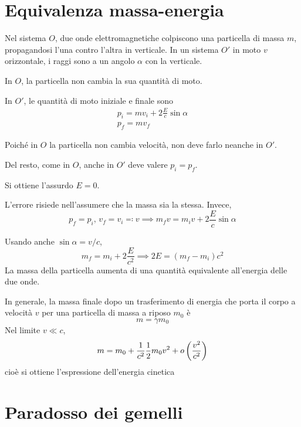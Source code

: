 \section{Equivalenza massa-energia}

Nel sistema $O$, due onde elettromagnetiche colpiscono una particella di massa $m$, propagandosi l'una contro l'altra in verticale.
In un sistema $O'$ in moto $v$ orizzontale, i raggi sono a un angolo $\alpha$ con la verticale.

In $O$, la particella non cambia la sua quantità di moto.

In $O'$, le quantità di moto iniziale e finale sono
\begin{gather}
    p_i = m v_i + 2 \frac{E}{c} \sin\alpha \\
    p_f = m v_f
\end{gather}

Poiché in $O$ la particella non cambia velocità, non deve farlo neanche in $O'$.

Del resto, come in $O$, anche in $O'$ deve valere $p_i = p_f$.

Si ottiene l'assurdo $E = 0$.

L'errore risiede nell'assumere che la massa sia la stessa.
Invece,
\begin{equation}
    p_f = p_i, \, v_f = v_i \eqcolon v
    \implies m_f v = m_i v + 2 \frac{E}{c} \sin\alpha
\end{equation}

Usando anche $\sin \alpha = v/c$,
\begin{equation}
    m_f = m_i + 2 \frac{E}{c^2}
    \implies
    2E = (m_f - m_i) c^2
\end{equation}
La massa della particella aumenta di una quantità equivalente all'energia delle due onde.

In generale, la massa finale dopo un trasferimento di energia che porta il corpo a velocità $v$ per una particella di massa a riposo $m_0$ è
\begin{equation}
    m = \gamma m_0
\end{equation}
Nel limite $v \ll c$,
\begin{equation}
    m = m_0 + \frac{1}{c^2} \frac{1}{2} m_0 v^2 + o\left( \frac{v^2}{c^2} \right)
\end{equation}
cioè si ottiene l'espressione dell'energia cinetica

\section{Paradosso dei gemelli}

